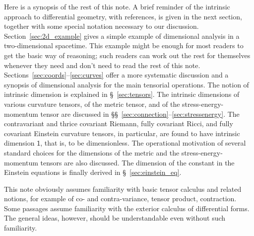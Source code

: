 \documentclass[\ifafour a4paper,12pt,\else a5paper,10pt,\fi%
onecolumn,oneside,article,%
british%
]{memoir}
\theoremstyle{remark}
\theoremstyle{innote}
\renewcommand*{\|}[1][]{\nonscript\,#1\vert\nonscript\;\mathopen{}}
\newcommand*{\sect}{\S}%
\newcommand*{\sects}{\S\S}%
\newcommand*{\Un}{\textsf{1}}
\begin{document}
\medskip

Here is a synopsis of the rest of this note. A brief reminder of the
intrinsic approach to differential geometry, with references, is given in
the next section, together with some special notation necessary to our
discussion. Section~\ref{sec:2d_example} gives a simple example of
dimensional analysis in a two-dimensional spacetime. This example might be
enough for most readers to get the basic way of reasoning; such readers can
work out the rest for themselves whenever they need and don't need to read
the rest of this note. Sections~\ref{sec:coords}--\ref{sec:curves} offer a
more systematic discussion and a synopsis of dimensional analysis for the
main tensorial operations. The notion of intrinsic dimension is explained
in \sect~\ref{sec:tensors}. The intrinsic dimensions of various curvature
tensors, of the metric tensor, and of the stress-energy-momentum tensor are
discussed in \sects~\ref{sec:connection}--\ref{sec:stressenergy}. The
contravariant and thrice covariant Riemann, fully covariant Ricci, and
fully covariant Einstein curvature tensors, in particular, are found to
have intrinsic dimension $\Un$, that is, to be dimensionless. The
operational motivation of several standard choices for the dimensions of
the metric and the stress-energy-momentum tensors are also discussed. The
dimension of the constant in the Einstein equations is finally derived in
\sect~\ref{sec:einstein_eq}.

This note obviously assumes familiarity with basic tensor calculus and
related notions, for example of co- and contra-variance, tensor product,
contraction. Some passages assume familiarity with the exterior calculus of
differential forms. The general ideas, however, should be understandable
even without such familiarity.







\end{document}
